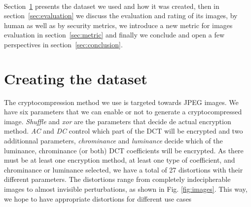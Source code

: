 \documentclass{article}
\begin{document}
  \paragraph*{}
  Section~\ref{sec:dataset} presents the dataset we used and how it was created, then in section~\ref{sec:evaluation} we discuss the evaluation and rating of its images, by human as well as by security metrics, we introduce a new metric for images evaluation in section~\ref{sec:metric} and finally we conclude and open a few perspectives in section~\ref{sec:conclusion}.


\section{Creating the dataset}
\label{sec:dataset}
The cryptocompression method we use is targeted towards JPEG images. We have six parameters that we can enable or not to generate a cryptocompressed image. \textit{Shuffle} and \textit{xor} are the parameters that decide de actual encryption method. \textit{AC} and \textit{DC} control which part of the DCT will be encrypted and two additionnal parameters, \textit{chrominance} and \textit{luminance} decide which of the luminance, chrominance (or both) DCT coefficients will be encrypted. As there must be at least one encryption method, at least one type of coefficient, and chrominance or luminance selected, we have a total of 27 distortions with their different parameters. The distortions range from completely indecipherable images to almost invisible perturbations, as shown in Fig. \ref{fig:images}. This way, we hope to have appropriate distortions for different use cases
\end{document}

